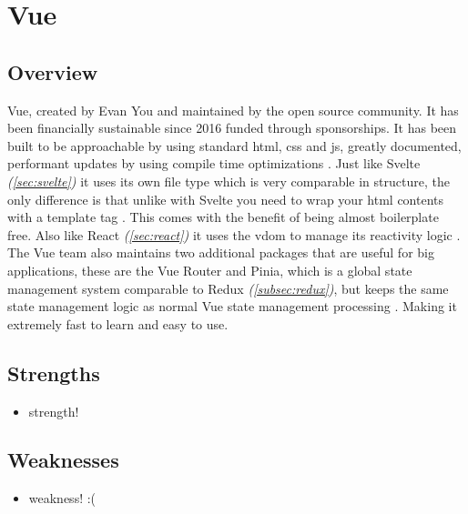 
\section{Vue}
\label{sec:vue}

\subsection{Overview}
\label{subsec:vue:overview}

Vue, created by Evan You and maintained by the open source community. It has been financially sustainable since 2016 funded through sponsorships. It has been built to be approachable by using standard \acrshort{html}, \acrshort{css} and \acrshort{js}, greatly documented, performant updates by using compile time optimizations \cite{vue:home}. Just like Svelte \textit{(\ref{sec:svelte})} it uses its own file type which is very comparable in structure, the only difference is that unlike with Svelte you need to wrap your \acrshort{html} contents with a template tag \cite{svelte:components, vue:template_syntax}. This comes with the benefit of being almost boilerplate free. Also like React \textit{(\ref{sec:react})} it uses the \acrshort{vdom} to manage its reactivity logic \cite{react:vdom,vue:rendering_mechanism}. The Vue team also maintains two additional packages that are useful for big applications, these are the Vue Router and Pinia, which is a global state management system comparable to Redux \textit{(\ref{subsec:redux})}, but keeps the same state management logic as normal Vue state management processing \cite{vue:router,vue:pinia}. Making it extremely fast to learn and easy to use.


\subsection{Strengths}
\label{subsec:vue:strengths}
\begin{itemize}
    \item strength! 
\end{itemize}

\subsection{Weaknesses}
\label{subsec:vue:weaknesses}
\begin{itemize}
    \item weakness! :( 
\end{itemize}
